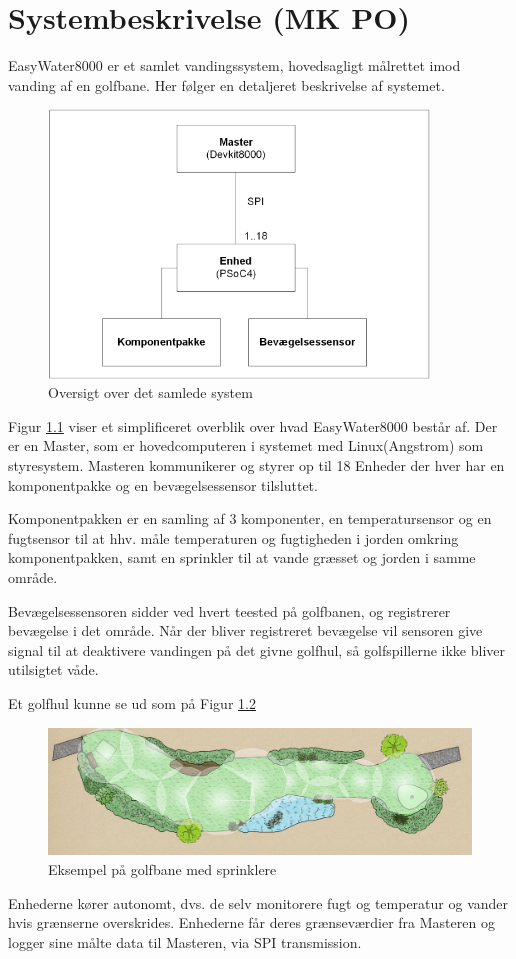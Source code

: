 \chapter{Systembeskrivelse (MK PO)}

EasyWater8000 er et samlet vandingssystem, hovedsagligt målrettet imod vanding af en golfbane. Her følger en detaljeret beskrivelse af systemet.

\begin{figure}[H]
  \centering
    \includegraphics[width=0.9\textwidth]{billeder/systembeskrivelse}
    \caption{Oversigt over det samlede system}
    \label{fig:systembeskrivelse}
\end{figure}

Figur \ref{fig:systembeskrivelse} viser et simplificeret overblik over hvad EasyWater8000 består af. Der er en Master, som er hovedcomputeren i systemet med Linux(Angstrom) som styresystem. Masteren kommunikerer og styrer op til 18 Enheder der hver har en komponentpakke og en bevægelsessensor tilsluttet.

Komponentpakken er en samling af 3 komponenter, en temperatursensor og en fugtsensor til at hhv. måle temperaturen og fugtigheden i jorden omkring komponentpakken, samt en sprinkler til at vande græsset og jorden i samme område.

Bevægelsessensoren sidder ved hvert teested på golfbanen, og registrerer bevægelse i det område. Når der bliver registreret bevægelse vil sensoren give signal til at deaktivere vandingen på det givne golfhul, så golfspillerne ikke bliver utilsigtet våde.

Et golfhul kunne se ud som på Figur \ref{fig:hul_med_sprinkler}

\begin{figure}[H]
  \centering
    \includegraphics[width=\textwidth]{billeder/hul_med_sprinkler}
    \caption{Eksempel på golfbane med sprinklere}
    \label{fig:hul_med_sprinkler}
\end{figure}

Enhederne kører autonomt, dvs. de selv monitorere fugt og temperatur og vander hvis grænserne overskrides. Enhederne får deres grænseværdier fra Masteren og logger sine målte data til Masteren, via SPI transmission.